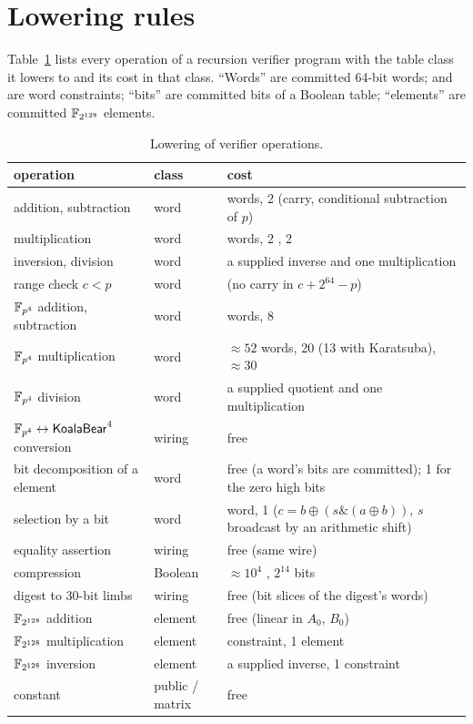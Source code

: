 \section{Lowering rules}\label{app:lowering}

Table~\ref{tab:lowering} lists every operation of a recursion verifier program with the table class it lowers to and its cost in that class. ``Words'' are committed 64-bit words; \AND{} and \MUL{} are word constraints; ``bits'' are committed bits of a Boolean table; ``elements'' are committed $\mathbb{F}_{2^{128}}$ elements.

\begin{table}[h]
\centering\small
\caption{Lowering of verifier operations.}
\label{tab:lowering}
\begin{tabularx}{\linewidth}{>{\raggedright\arraybackslash}p{3.6cm}l>{\raggedright\arraybackslash}X}
\toprule
operation & class & cost \\
\midrule
\KB{} addition, subtraction & word & 2 words, 2 \AND{} (carry, conditional subtraction of $p$) \\
\KB{} multiplication & word & 5 words, 2 \MUL{}, 2 \AND{} \\
\KB{} inversion, division & word & a supplied inverse and one multiplication \\
\KB{} range check $c<p$ & word & 1 \AND{} (no carry in $c + 2^{64}-p$) \\
$\mathbb{F}_{p^4}$ addition, subtraction & word & 8 words, 8 \AND{} \\
$\mathbb{F}_{p^4}$ multiplication & word & $\approx 52$ words, 20 \MUL{} (13 with Karatsuba), $\approx 30$ \AND{} \\
$\mathbb{F}_{p^4}$ division & word & a supplied quotient and one multiplication \\
$\mathbb{F}_{p^4} \leftrightarrow \mathsf{KoalaBear}^4$ conversion & wiring & free \\
bit decomposition of a \KB{} element & word & free (a word's bits are committed); 1 \AND{} for the zero high bits \\
selection by a bit & word & 1 word, 1 \AND{} ($c = b \oplus (s \mathbin{\&} (a\oplus b))$, $s$ broadcast by an arithmetic shift) \\
equality assertion & wiring & free (same wire) \\
\Blake{} compression & Boolean & $\approx 10^4$ \AND{}, $2^{14}$ bits \\
digest to 30-bit limbs & wiring & free (bit slices of the digest's words) \\
$\mathbb{F}_{2^{128}}$ addition & element & free (linear in $A_0$, $B_0$) \\
$\mathbb{F}_{2^{128}}$ multiplication & element & 1 constraint, 1 element \\
$\mathbb{F}_{2^{128}}$ inversion & element & a supplied inverse, 1 constraint \\
constant & public / matrix & free \\
\bottomrule
\end{tabularx}
\end{table}
